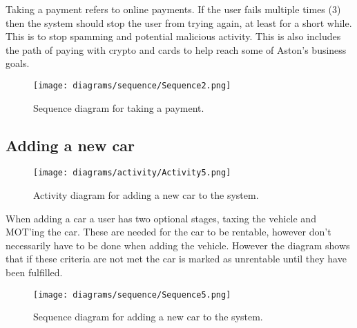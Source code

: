     Taking a payment refers to online payments. If the user fails multiple times (3) then the system should stop
    the user from trying again, at least for a short while. This is to stop spamming and potential malicious activity.
    This is also includes the path of paying with crypto and cards to help reach some of Aston's business goals.

    \begin{figure}[H]
      \centering
      \texttt{[image: diagrams/sequence/Sequence2.png]}
      \caption{Sequence diagram for taking a payment.}
      \label{fig:takePaymentSequence}
    \end{figure}

  \newpage

  \subsection{Adding a new car}

    \begin{figure}[H]
      \centering
      \texttt{[image: diagrams/activity/Activity5.png]}
      \caption{Activity diagram for adding a new car to the system.}
      \label{fig:newCarActivity}
    \end{figure}

    When adding a car a user has two optional stages, taxing the vehicle and MOT'ing the car. These are needed for the 
    car to be rentable, however don't necessarily have to be done when adding the vehicle. However the diagram shows that
    if these criteria are not met the car is marked as unrentable until they have been fulfilled.

    \begin{figure}[H]
      \centering
      \texttt{[image: diagrams/sequence/Sequence5.png]}
      \caption{Sequence diagram for adding a new car to the system.}
      \label{fig:newCarSequence}
    \end{figure}
\newpage